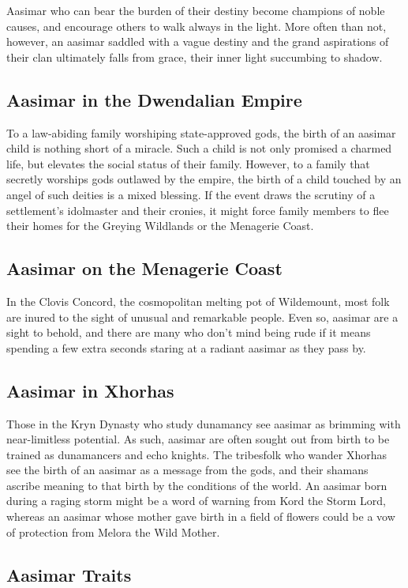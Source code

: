 \documentclass[10pt,a4paper,twoside,bg=print,twocolumn,openany,nodeprecatedcode]{dndbook}
\begin{document}
Aasimar who can bear the burden of their destiny become champions of noble causes, and encourage others to walk always in the light. More often than not, however, an aasimar saddled with a vague destiny and the grand aspirations of their clan ultimately falls from grace, their inner light succumbing to shadow.

\subsection{Aasimar in the Dwendalian Empire}
To a law-abiding family worshiping state-approved gods, the birth of an aasimar child is nothing short of a miracle. Such a child is not only promised a charmed life, but elevates the social status of their family. However, to a family that secretly worships gods outlawed by the empire, the birth of a child touched by an angel of such deities is a mixed blessing. If the event draws the scrutiny of a settlement's idolmaster and their cronies, it might force family members to flee their homes for the Greying Wildlands or the Menagerie Coast.

\subsection{Aasimar on the Menagerie Coast}
In the Clovis Concord, the cosmopolitan melting pot of Wildemount, most folk are inured to the sight of unusual and remarkable people. Even so, aasimar are a sight to behold, and there are many who don't mind being rude if it means spending a few extra seconds staring at a radiant aasimar as they pass by.

\subsection{Aasimar in Xhorhas}
Those in the Kryn Dynasty who study dunamancy see aasimar as brimming with near-limitless potential. As such, aasimar are often sought out from birth to be trained as dunamancers and echo knights. The tribesfolk who wander Xhorhas see the birth of an aasimar as a message from the gods, and their shamans ascribe meaning to that birth by the conditions of the world. An aasimar born during a raging storm might be a word of warning from Kord the Storm Lord, whereas an aasimar whose mother gave birth in a field of flowers could be a vow of protection from Melora the Wild Mother.

\subsection{Aasimar Traits}
\end{document}

